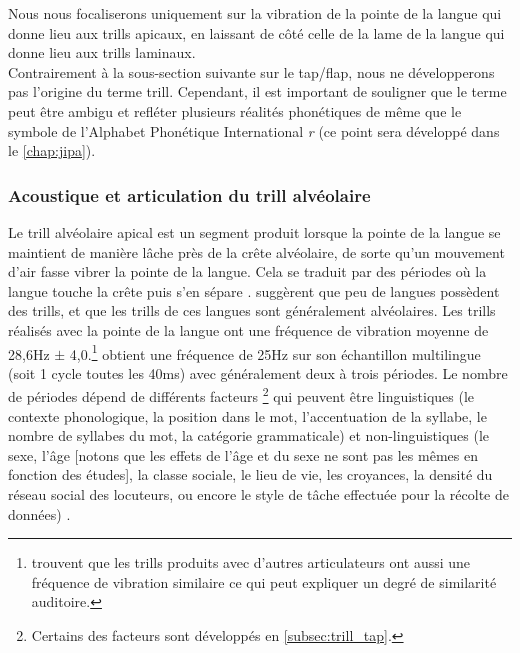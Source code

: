 Nous nous focaliserons uniquement sur la vibration de la pointe de la langue qui donne lieu aux trills apicaux, en laissant de côté celle de la lame de la langue qui donne lieu aux trills laminaux.\\

Contrairement à la sous-section suivante sur le tap/flap, nous ne développerons pas l'origine du terme trill. Cependant, il est important de souligner que le terme peut être ambigu et refléter plusieurs réalités phonétiques de même que le symbole de l'Alphabet Phonétique International \textit{r} (ce point sera développé dans le \autoref{chap:jipa}).

\subsubsection{Acoustique et articulation du trill alvéolaire} \label{subsec:trill}

Le trill alvéolaire apical est un segment produit lorsque la pointe de la langue se maintient de manière lâche près de la crête alvéolaire, de sorte qu'un mouvement d'air fasse vibrer la pointe de la langue. Cela se traduit par des périodes où la langue touche la crête puis s'en sépare \parencite[318]{ladefogedCoursePhonetics2015}.
\textcite[49]{ladefogedLateralsTrills1977} suggèrent que peu de langues possèdent des trills, et que les trills de ces langues sont généralement alvéolaires. Les trills réalisés avec la pointe de la langue ont une fréquence de vibration moyenne de 28,6Hz $\pm$ 4,0.\footnote{\textcite{ladefogedLateralsTrills1977} trouvent que les trills produits avec d'autres articulateurs ont aussi une fréquence de vibration similaire ce qui peut expliquer un degré de similarité auditoire.} \textcite{lindauStory1985} obtient une fréquence de 25Hz sur son échantillon multilingue (soit 1 cycle toutes les 40ms) avec généralement deux à trois périodes. Le nombre de périodes dépend de différents facteurs
\footnote{Certains des facteurs sont développés en \autoref{subsec:trill_tap}.} qui peuvent être linguistiques (le contexte phonologique, la position dans le mot, l'accentuation de la syllabe, le nombre de syllabes du mot, la catégorie grammaticale) \parencite[cf. tableau p. 23 pour les études d'intérêt]{zahlerVariationistAccountTrill2014} et non-linguistiques (le sexe, l'âge [notons que les effets de l'âge et du sexe ne sont pas les mêmes en fonction des études], la classe sociale, le lieu de vie, les croyances, la densité du réseau social des locuteurs, ou encore le style de tâche effectuée pour la récolte de données) \parencite[cf. tableau p. 21-22 pour les études d'intérêt]{zahlerVariationistAccountTrill2014}.\\

